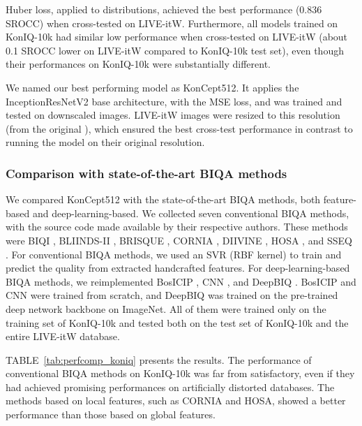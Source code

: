 \documentclass[10pt,journal,compsoc]{IEEEtran}
\begin{document}
Huber loss, applied to distributions, achieved the best performance (0.836 SROCC) when cross-tested on LIVE-itW. 
Furthermore, all models trained on KonIQ-10k had similar low performance when cross-tested on LIVE-itW (about 0.1 SROCC lower on LIVE-itW compared to KonIQ-10k test set), even though their performances on KonIQ-10k were substantially different.

We named our best performing model as KonCept512. It applies the InceptionResNetV2 base architecture, with the MSE loss, and was trained and tested on downscaled  images. LIVE-itW images were resized to this resolution (from the original ), which ensured the best cross-test performance in contrast to running the model on their original resolution.

\subsubsection{Comparison with state-of-the-art BIQA methods}


We compared KonCept512 with the state-of-the-art BIQA methods, both feature-based and deep-learning-based. We collected seven conventional BIQA methods, with the source code made available by their respective authors. These methods were BIQI \cite{Moorthy:2010}, BLIINDS-II \cite{blind2}, BRISQUE \cite{bris}, CORNIA \cite{ye2012unsupervised}, DIIVINE \cite{Moorthy:2011}, HOSA \cite{hosa}, and SSEQ \cite{Liu:2014b}.
For conventional BIQA methods, we used an SVR (RBF kernel) to train and predict the quality from extracted handcrafted features. 
For deep-learning-based BIQA methods, we reimplemented BosICIP \cite{boss}, CNN \cite{conv1}, and DeepBIQ \cite{bianco2018use}. BosICIP and CNN were trained from scratch, and DeepBIQ was trained on the pre-trained deep network backbone on ImageNet. 
All of them were trained only on the training set of KonIQ-10k and tested both on the test set of KonIQ-10k and the entire LIVE-itW database.

TABLE~\ref{tab:perfcomp_koniq} presents the results. The performance of conventional BIQA methods on KonIQ-10k was far from satisfactory, even if they had achieved promising performances on artificially distorted databases. The methods based on local features, such as CORNIA and HOSA, showed a better performance than those based on global features.
\end{document}

